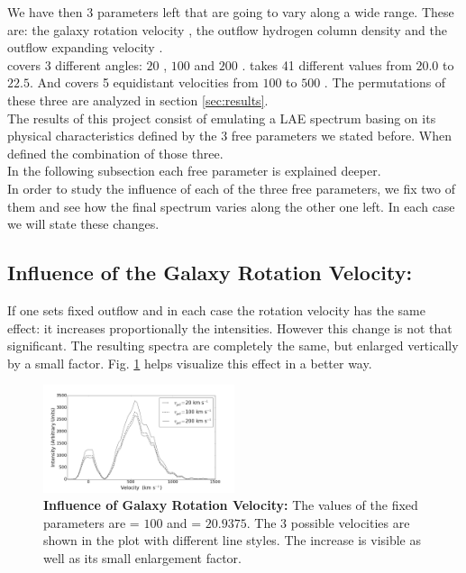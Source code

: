 \documentclass{latex/emulateapj}
\begin{document}
We have then 3 parameters left that are going to vary along a wide range. These are: the galaxy rotation velocity \vrot, the outflow hydrogen column density \nh and the outflow expanding velocity \vout. \\

\vrot covers 3 different angles: $20$ \kms, $100$ \kms and $200$ \kms. \lognh takes 41 different values from $20.0$ to $22.5$. And \vout covers 5 equidistant velocities from $100$ \kms to $500$ \kms. The permutations of these three are analyzed in section \ref{sec:results}. \\ 

The results of this project consist of emulating a LAE spectrum basing on its physical characteristics defined by the 3 free parameters we stated before. When defined the combination of those three. \\

In the following subsection each free parameter is explained deeper. \\

In order to study the influence of each of the three free parameters, we fix two of them and see how the final spectrum varies along the other one left. In each case we will state these changes.\\

\subsection{Influence of the Galaxy Rotation Velocity: \vrot}

If one sets fixed outflow \vout and \lognh in each case the rotation velocity has the same effect: it increases proportionally the intensities. However this change is not that significant. The resulting spectra are completely the same, but enlarged vertically by a small factor. Fig. \ref{fig:influence_vrot} helps visualize this effect in a better way.\\

\begin{figure}[h!]
\begin{center}
	\includegraphics[width=0.5\textwidth]{./figures/inf_vgal_soft.png}
\end{center}
\caption{\textbf{Influence of Galaxy Rotation Velocity:} The values of the fixed parameters are \vout = $100$ \kms and \lognh = $20.9375$. The 3 possible velocities are shown in the plot with different line styles. The increase is visible as well as its small enlargement factor.\\
\label{fig:influence_vrot}}
\end{figure}
\end{document}
